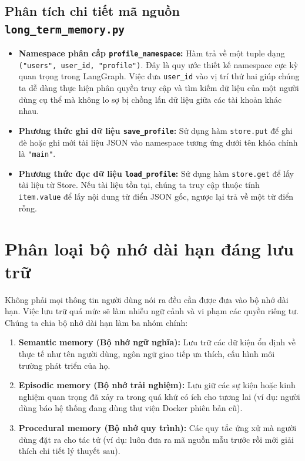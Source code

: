 \begingroup

\endgroup

\subsection{Phân tích chi tiết mã nguồn \texttt{long\_term\_memory.py}}
\begin{itemize}
  \item \textbf{Namespace phân cấp \texttt{profile\_namespace}:} Hàm trả về một tuple dạng \texttt{("users", user\_id, "profile")}. Đây là quy ước thiết kế namespace cực kỳ quan trọng trong LangGraph. Việc đưa \texttt{user\_id} vào vị trí thứ hai giúp chúng ta dễ dàng thực hiện phân quyền truy cập và tìm kiếm dữ liệu của một người dùng cụ thể mà không lo sợ bị chồng lấn dữ liệu giữa các tài khoản khác nhau.
  \item \textbf{Phương thức ghi dữ liệu \texttt{save\_profile}:} Sử dụng hàm \texttt{store.put} để ghi đè hoặc ghi mới tài liệu JSON vào namespace tương ứng dưới tên khóa chính là \texttt{"main"}.
  \item \textbf{Phương thức đọc dữ liệu \texttt{load\_profile}:} Sử dụng hàm \texttt{store.get} để lấy tài liệu từ Store. Nếu tài liệu tồn tại, chúng ta truy cập thuộc tính \texttt{item.value} để lấy nội dung từ điển JSON gốc, ngược lại trả về một từ điển rỗng.
\end{itemize}

\section{Phân loại bộ nhớ dài hạn đáng lưu trữ}

Không phải mọi thông tin người dùng nói ra đều cần được đưa vào bộ nhớ dài hạn. Việc lưu trữ quá mức sẽ làm nhiễu ngữ cảnh và vi phạm các quyền riêng tư. Chúng ta chia bộ nhớ dài hạn làm ba nhóm chính:
\begin{enumerate}
  \item \textbf{Semantic memory (Bộ nhớ ngữ nghĩa):} Lưu trữ các dữ kiện ổn định về thực tế như tên người dùng, ngôn ngữ giao tiếp ưa thích, cấu hình môi trường phát triển của họ.
  \item \textbf{Episodic memory (Bộ nhớ trải nghiệm):} Lưu giữ các sự kiện hoặc kinh nghiệm quan trọng đã xảy ra trong quá khứ có ích cho tương lai (ví dụ: người dùng báo hệ thống đang dùng thư viện Docker phiên bản cũ).
  \item \textbf{Procedural memory (Bộ nhớ quy trình):} Các quy tắc ứng xử mà người dùng đặt ra cho tác tử (ví dụ: luôn đưa ra mã nguồn mẫu trước rồi mới giải thích chi tiết lý thuyết sau).
\end{enumerate}

